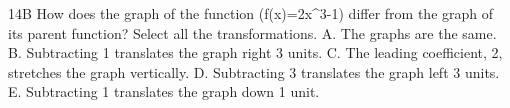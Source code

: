 \documentclass{article}
\newenvironment{ta-item}[2]{}{}        %
\newcommand{\answer}[1]{}              %
\begin{document}
\begin{ta-item}{14}{B}
How does the graph of the function (f(x)=2x^3-1) differ from the graph of its parent function? Select all the transformations.
A. The graphs are the same.
B. Subtracting 1 translates the graph right 3 units.
C. The leading coefficient, 2, stretches the graph vertically.
D. Subtracting 3 translates the graph left 3 units.
E. Subtracting 1 translates the graph down 1 unit.
\answer{14. C, E}
\end{ta-item}
\end{document}
